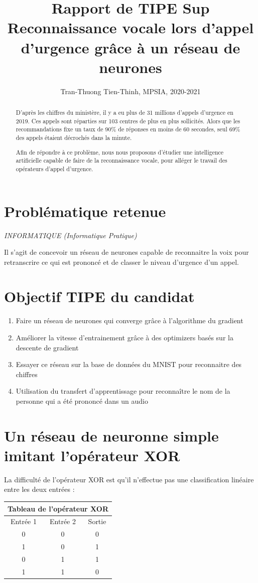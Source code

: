 \documentclass[12pt,a4paper, french]{article}
\title{Rapport de TIPE Sup \\
Reconnaissance vocale lors d'appel d'urgence grâce à un réseau de neurones}
\author{Tran-Thuong Tien-Thinh, MPSIA, 2020-2021}
\date{}
\begin{document}
\maketitle

\begin{abstract}
D'après les chiffres du ministère, il y a eu plus de 31 millions d'appels d'urgence en 2019. Ces appels sont réparties sur 103 centres de plus en plus sollicités. Alors que les recommandations fixe un taux de 90\% de réponses en moins de 60 secondes, seul 69\% des appels étaient décrochés dans la minute.  

Afin de répondre à ce problème, nous nous proposons d'étudier une intelligence artificielle capable de faire de la reconnaissance vocale, pour alléger le travail des opérateurs d'appel d'urgence.
\end{abstract}

\section*{Problématique retenue}
\noindent\textit{INFORMATIQUE (Informatique Pratique)}

Il s’agit de concevoir un réseau de neurones capable de reconnaitre la voix pour retranscrire ce qui est prononcé et de classer le niveau d'urgence d'un appel.

\section*{Objectif TIPE du candidat}
\begin{enumerate}
    \item Faire un réseau de neurones qui converge grâce à l’algorithme du gradient
    \item Améliorer la vitesse d'entrainement grâce à des optimizers basés sur la descente de gradient
    \item Essayer ce réseau sur la base de données du MNIST pour reconnaitre des chiffres
    \item Utilisation du transfert d'apprentissage pour reconnaître le nom de la personne qui a été prononcé dans un audio
\end{enumerate}

\section{Un réseau de neuronne simple imitant l'opérateur XOR}
La difficulté de l'opérateur XOR est qu'il n'effectue pas une classification linéaire entre les deux entrées :
\begin{center}
\begin{tabular}{ |c|c||c|   }
 \hline
 \multicolumn{3}{|c|}{Tableau de l'opérateur XOR} \\
 \hline
 Entrée 1 & Entrée 2 & Sortie\\
 \hline
 0 & 0 & 0\\
 1 & 0 & 1\\
 0 & 1 & 1\\
 1 & 1 & 0\\
 \hline
\end{tabular}
\end{center}
\end{document}
